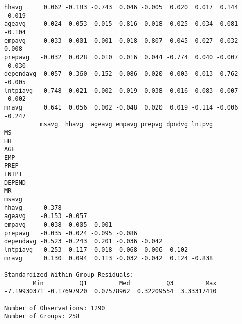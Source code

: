 \documentclass[]{book}
\newenvironment{Shaded}{\begin{snugshade}}{\end{snugshade}}
\newcommand{\CommentTok}[1]{\textcolor[rgb]{0.56,0.35,0.01}{\textit{#1}}}
\newcommand{\DecValTok}[1]{\textcolor[rgb]{0.00,0.00,0.81}{#1}}
\newcommand{\KeywordTok}[1]{\textcolor[rgb]{0.13,0.29,0.53}{\textbf{#1}}}
\newcommand{\NormalTok}[1]{#1}
\newcommand{\OperatorTok}[1]{\textcolor[rgb]{0.81,0.36,0.00}{\textbf{#1}}}
\newcommand{\StringTok}[1]{\textcolor[rgb]{0.31,0.60,0.02}{#1}}
\begin{document}
\begin{verbatim}
hhavg      0.062 -0.183 -0.743  0.046 -0.005  0.020  0.017  0.144 -0.019
ageavg    -0.024  0.053  0.015 -0.816 -0.018  0.025  0.034 -0.081 -0.104
empavg    -0.033  0.001 -0.001 -0.018 -0.807  0.045 -0.027  0.032  0.008
prepavg   -0.032  0.028  0.010  0.016  0.044 -0.774  0.040 -0.007 -0.030
dependavg  0.057  0.360  0.152 -0.086  0.020  0.003 -0.013 -0.762 -0.005
lntpiavg  -0.748 -0.021 -0.002 -0.019 -0.038 -0.016  0.083 -0.007 -0.002
mravg      0.641  0.056  0.002 -0.048  0.020  0.019 -0.114 -0.006 -0.247
          msavg  hhavg  ageavg empavg prepvg dpndvg lntpvg
MS                                                        
HH                                                        
AGE                                                       
EMP                                                       
PREP                                                      
LNTPI                                                     
DEPEND                                                    
MR                                                        
msavg                                                     
hhavg      0.378                                          
ageavg    -0.153 -0.057                                   
empavg    -0.038  0.005  0.001                            
prepavg   -0.035 -0.024 -0.095 -0.086                     
dependavg -0.523 -0.243  0.201 -0.036 -0.042              
lntpiavg  -0.253 -0.117 -0.018  0.068  0.006 -0.102       
mravg      0.130  0.094  0.113 -0.032 -0.042  0.124 -0.838

Standardized Within-Group Residuals:
        Min          Q1         Med          Q3         Max 
-7.19930371 -0.17697920  0.07578962  0.32209554  3.33317410 

Number of Observations: 1290
Number of Groups: 258 
\end{verbatim}

\begin{Shaded}
\end{Shaded}
\end{document}
